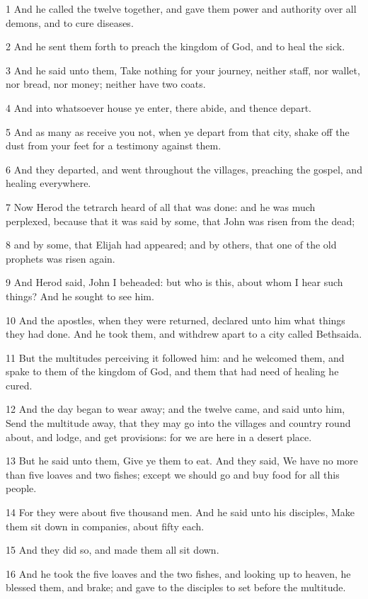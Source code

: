 \par 1 And he called the twelve together, and gave them power and authority over all demons, and to cure diseases.
\par 2 And he sent them forth to preach the kingdom of God, and to heal the sick.
\par 3 And he said unto them, Take nothing for your journey, neither staff, nor wallet, nor bread, nor money; neither have two coats.
\par 4 And into whatsoever house ye enter, there abide, and thence depart.
\par 5 And as many as receive you not, when ye depart from that city, shake off the dust from your feet for a testimony against them.
\par 6 And they departed, and went throughout the villages, preaching the gospel, and healing everywhere.
\par 7 Now Herod the tetrarch heard of all that was done: and he was much perplexed, because that it was said by some, that John was risen from the dead;
\par 8 and by some, that Elijah had appeared; and by others, that one of the old prophets was risen again.
\par 9 And Herod said, John I beheaded: but who is this, about whom I hear such things? And he sought to see him.
\par 10 And the apostles, when they were returned, declared unto him what things they had done. And he took them, and withdrew apart to a city called Bethsaida.
\par 11 But the multitudes perceiving it followed him: and he welcomed them, and spake to them of the kingdom of God, and them that had need of healing he cured.
\par 12 And the day began to wear away; and the twelve came, and said unto him, Send the multitude away, that they may go into the villages and country round about, and lodge, and get provisions: for we are here in a desert place.
\par 13 But he said unto them, Give ye them to eat. And they said, We have no more than five loaves and two fishes; except we should go and buy food for all this people.
\par 14 For they were about five thousand men. And he said unto his disciples, Make them sit down in companies, about fifty each.
\par 15 And they did so, and made them all sit down.
\par 16 And he took the five loaves and the two fishes, and looking up to heaven, he blessed them, and brake; and gave to the disciples to set before the multitude.
